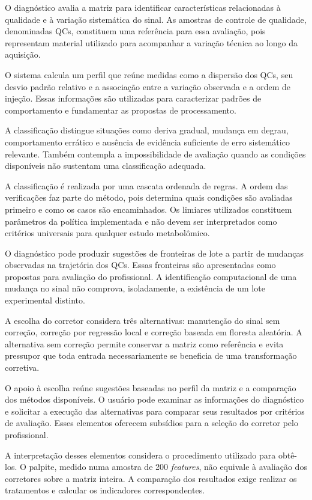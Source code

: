 O diagnóstico avalia a matriz para identificar características relacionadas à qualidade e à variação sistemática do sinal. As amostras de controle de qualidade, denominadas QCs, constituem uma referência para essa avaliação, pois representam material utilizado para acompanhar a variação técnica ao longo da aquisição.

O sistema calcula um perfil que reúne medidas como a dispersão dos QCs, seu desvio padrão relativo e a associação entre a variação observada e a ordem de injeção. Essas informações são utilizadas para caracterizar padrões de comportamento e fundamentar as propostas de processamento.

A classificação distingue situações como deriva gradual, mudança em degrau, comportamento errático e ausência de evidência suficiente de erro sistemático relevante. Também contempla a impossibilidade de avaliação quando as condições disponíveis não sustentam uma classificação adequada.

A classificação é realizada por uma cascata ordenada de regras. A ordem das verificações faz parte do método, pois determina quais condições são avaliadas primeiro e como os casos são encaminhados. Os limiares utilizados constituem parâmetros da política implementada e não devem ser interpretados como critérios universais para qualquer estudo metabolômico.

O diagnóstico pode produzir sugestões de fronteiras de lote a partir de mudanças observadas na trajetória dos QCs. Essas fronteiras são apresentadas como propostas para avaliação do profissional. A identificação computacional de uma mudança no sinal não comprova, isoladamente, a existência de um lote experimental distinto.

A escolha do corretor considera três alternativas: manutenção do sinal sem correção, correção por regressão local e correção baseada em floresta aleatória. A alternativa sem correção permite conservar a matriz como referência e evita pressupor que toda entrada necessariamente se beneficia de uma transformação corretiva.

O apoio à escolha reúne sugestões baseadas no perfil da matriz e a comparação dos métodos disponíveis. O usuário pode examinar as informações do diagnóstico e solicitar a execução das alternativas para comparar seus resultados por critérios de avaliação. Esses elementos oferecem subsídios para a seleção do corretor pelo profissional.

A interpretação desses elementos considera o procedimento utilizado para obtê-los. O palpite, medido numa amostra de 200 \textit{features}, não equivale à avaliação dos corretores sobre a matriz inteira. A comparação dos resultados exige realizar os tratamentos e calcular os indicadores correspondentes.

